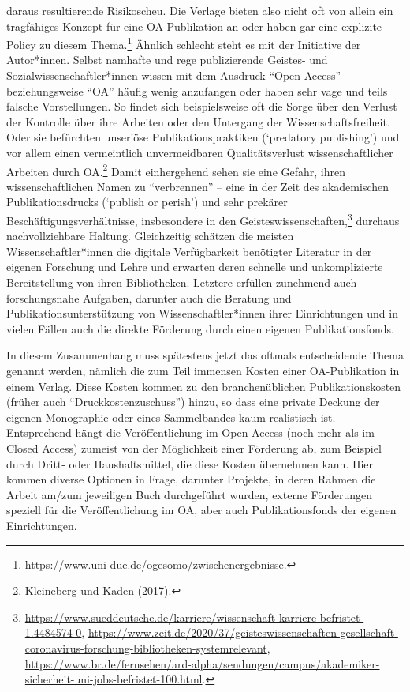 \documentclass[a4paper,
fontsize=11pt,
oneside,
numbers=noperiodatend,
parskip=half-,
bibliography=totoc,
final
]{scrartcl}
\begin{document}
daraus resultierende Risikoscheu. Die Verlage bieten also nicht oft von
allein ein tragfähiges Konzept für eine OA-Publikation an oder haben gar
eine explizite Policy zu diesem Thema.\footnote{\url{https://www.uni-due.de/ogesomo/zwischenergebnisse}.}
Ähnlich schlecht steht es mit der Initiative der Autor*innen. Selbst
namhafte und rege publizierende Geistes- und Sozialwissenschaftler*innen
wissen mit dem Ausdruck ``Open Access'' beziehungsweise ``OA'' häufig
wenig anzufangen oder haben sehr vage und teils falsche Vorstellungen.
So findet sich beispielsweise oft die Sorge über den Verlust der
Kontrolle über ihre Arbeiten oder den Untergang der
Wissenschaftsfreiheit. Oder sie befürchten unseriöse
Publikationspraktiken (`predatory publishing') und vor allem einen
vermeintlich unvermeidbaren Qualitätsverlust wissenschaftlicher Arbeiten
durch OA.\footnote{Kleineberg und Kaden (2017).} Damit einhergehend
sehen sie eine Gefahr, ihren wissenschaftlichen Namen zu ``verbrennen''
-- eine in der Zeit des akademischen Publikationsdrucks (`publish or
perish') und sehr prekärer Beschäftigungsverhältnisse, insbesondere in
den Geisteswissenschaften,\footnote{\url{https://www.sueddeutsche.de/karriere/wissenschaft-karriere-befristet-1.4484574-0},
  \href{https://www.zeit.de/2020/37/geisteswissenschaften-gesellschaft-coronavirus-forschung-bibliotheken-systemrelevant}{https://www.zeit.de/2020/37/geisteswissenschaften-gesellschaft-coronavirus-forschung-bibliotheken-systemrelevant},
  \url{https://www.br.de/fernsehen/ard-alpha/sendungen/campus/akademiker-sicherheit-uni-jobs-befristet-100.html}.}
durchaus nachvollziehbare Haltung. Gleichzeitig schätzen die meisten
Wissenschaftler*innen die digitale Verfügbarkeit benötigter Literatur in
der eigenen Forschung und Lehre und erwarten deren schnelle und
unkomplizierte Bereitstellung von ihren Bibliotheken. Letztere erfüllen
zunehmend auch forschungsnahe Aufgaben, darunter auch die Beratung und
Publikationsunterstützung von Wissenschaftler*innen ihrer Einrichtungen
und in vielen Fällen auch die direkte Förderung durch einen eigenen
Publikationsfonds.

In diesem Zusammenhang muss spätestens jetzt das oftmals entscheidende
Thema genannt werden, nämlich die zum Teil immensen Kosten einer
OA-Publikation in einem Verlag. Diese Kosten kommen zu den
branchenüblichen Publikationskosten (früher auch
``Druckkostenzuschuss'') hinzu, so dass eine private Deckung der eigenen
Monographie oder eines Sammelbandes kaum realistisch ist. Entsprechend
hängt die Veröffentlichung im Open Access (noch mehr als im Closed
Access) zumeist von der Möglichkeit einer Förderung ab, zum Beispiel
durch Dritt- oder Haushaltsmittel, die diese Kosten übernehmen kann.
Hier kommen diverse Optionen in Frage, darunter Projekte, in deren
Rahmen die Arbeit am/zum jeweiligen Buch durchgeführt wurden, externe
Förderungen speziell für die Veröffentlichung im OA, aber auch
Publikationsfonds der eigenen Einrichtungen.
\end{document}
